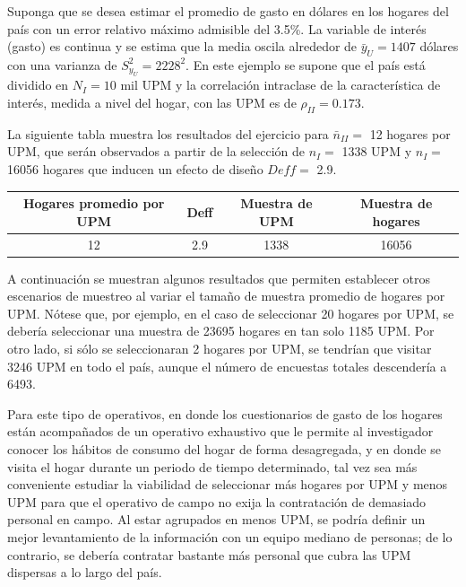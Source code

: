 \documentclass[
  10pt,
  spanish,
]{book}
\begin{document}
Suponga que se desea estimar el promedio de gasto en dólares en los hogares del país con un error relativo máximo admisible del 3.5\%. La variable de interés (gasto) es continua y se estima que la media oscila alrededor de \(\bar{y}_U=1407\) dólares con una varianza de \(S^2_{y_U}=2228^2\). En este ejemplo se supone que el país está dividido en \(N_I = 10\) mil UPM y la correlación intraclase de la característica de interés, medida a nivel del hogar, con las UPM es de \(\rho_{II} = 0.173\).

La siguiente tabla muestra los resultados del ejercicio para \(\bar{n}_{II} =\) 12 hogares por UPM, que serán observados a partir de la selección de \(n_{I} =\) 1338 UPM y \(n_{I} =\) 16056 hogares que inducen un efecto de diseño \(Deff =\) 2.9.

\begin{longtable}[]{@{}cccc@{}}
\toprule
Hogares promedio por UPM & Deff & Muestra de UPM & Muestra de hogares \\
\midrule
\endhead
12 & 2.9 & 1338 & 16056 \\
\bottomrule
\end{longtable}

A continuación se muestran algunos resultados que permiten establecer otros escenarios de muestreo al variar el tamaño de muestra promedio de hogares por UPM. Nótese que, por ejemplo, en el caso de seleccionar 20 hogares por UPM, se debería seleccionar una muestra de 23695 hogares en tan solo 1185 UPM. Por otro lado, si sólo se seleccionaran 2 hogares por UPM, se tendrían que visitar 3246 UPM en todo el país, aunque el número de encuestas totales descendería a 6493.

Para este tipo de operativos, en donde los cuestionarios de gasto de los hogares están acompañados de un operativo exhaustivo que le permite al investigador conocer los hábitos de consumo del hogar de forma desagregada, y en donde se visita el hogar durante un periodo de tiempo determinado, tal vez sea más conveniente estudiar la viabilidad de seleccionar más hogares por UPM y menos UPM para que el operativo de campo no exija la contratación de demasiado personal en campo. Al estar agrupados en menos UPM, se podría definir un mejor levantamiento de la información con un equipo mediano de personas; de lo contrario, se debería contratar bastante más personal que cubra las UPM dispersas a lo largo del país.
\end{document}
